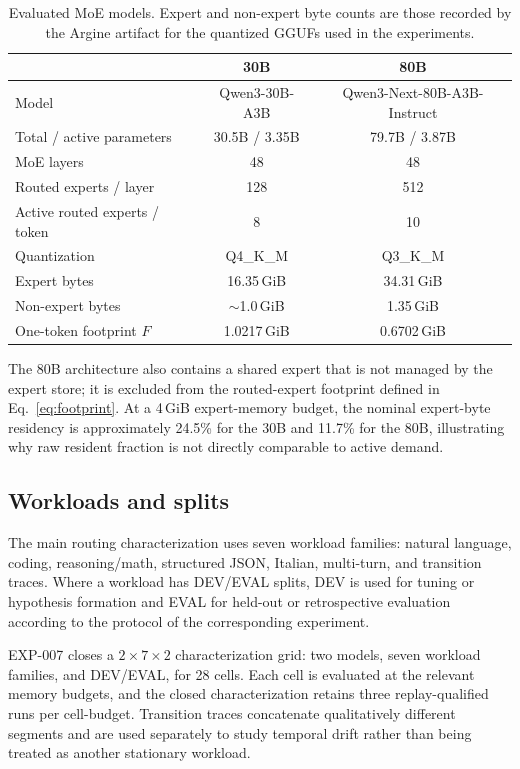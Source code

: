 \begin{table}[t]
    \centering
    \caption{Evaluated MoE models. Expert and non-expert byte counts are those recorded by the Argine artifact for the quantized GGUFs used in the experiments.}
    \label{tab:models}
    \small
    \begin{tabular}{lcc}
        \toprule
        & \textbf{30B} & \textbf{80B} \\
        \midrule
        Model & Qwen3-30B-A3B & Qwen3-Next-80B-A3B-Instruct \\
        Total / active parameters & 30.5B / 3.35B & 79.7B / 3.87B \\
        MoE layers & 48 & 48 \\
        Routed experts / layer & 128 & 512 \\
        Active routed experts / token & 8 & 10 \\
        Quantization & Q4\_K\_M & Q3\_K\_M \\
        Expert bytes & 16.35\,GiB & 34.31\,GiB \\
        Non-expert bytes & $\sim$1.0\,GiB & 1.35\,GiB \\
        One-token footprint $F$ & 1.0217\,GiB & 0.6702\,GiB \\
        \bottomrule
    \end{tabular}
\end{table}

The 80B architecture also contains a shared expert that is not managed by the expert store; it is excluded from the routed-expert footprint defined in Eq.~\eqref{eq:footprint}. At a 4\,GiB expert-memory budget, the nominal expert-byte residency is approximately 24.5\% for the 30B and 11.7\% for the 80B, illustrating why raw resident fraction is not directly comparable to active demand.

\subsection{Workloads and splits}

The main routing characterization uses seven workload families: natural language, coding, reasoning/math, structured JSON, Italian, multi-turn, and transition traces. Where a workload has DEV/EVAL splits, DEV is used for tuning or hypothesis formation and EVAL for held-out or retrospective evaluation according to the protocol of the corresponding experiment.

EXP-007 closes a $2\times 7\times 2$ characterization grid: two models, seven workload families, and DEV/EVAL, for 28 cells. Each cell is evaluated at the relevant memory budgets, and the closed characterization retains three replay-qualified runs per cell-budget. Transition traces concatenate qualitatively different segments and are used separately to study temporal drift rather than being treated as another stationary workload.

